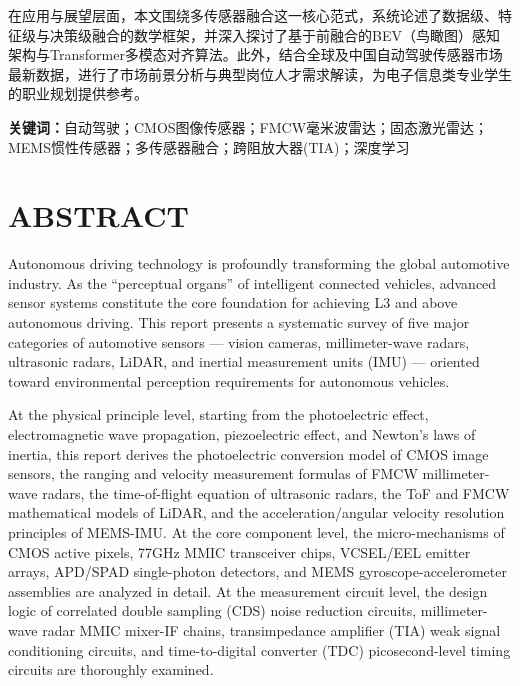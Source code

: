 \documentclass[12pt,a4paper,openany,UTF8]{ctexbook}
\begin{document}
在应用与展望层面，本文围绕多传感器融合这一核心范式，系统论述了数据级、特征级与决策级融合的数学框架，并深入探讨了基于前融合的BEV（鸟瞰图）感知架构与Transformer多模态对齐算法。此外，结合全球及中国自动驾驶传感器市场最新数据，进行了市场前景分析与典型岗位人才需求解读，为电子信息类专业学生的职业规划提供参考。

\vspace{1em}
\noindent\textbf{关键词：}自动驾驶；CMOS图像传感器；FMCW毫米波雷达；固态激光雷达；MEMS惯性传感器；多传感器融合；跨阻放大器(TIA)；深度学习

\clearpage

\chapter*{\bfseries ABSTRACT}

Autonomous driving technology is profoundly transforming the global automotive industry. As the ``perceptual organs'' of intelligent connected vehicles, advanced sensor systems constitute the core foundation for achieving L3 and above autonomous driving. This report presents a systematic survey of five major categories of automotive sensors — vision cameras, millimeter-wave radars, ultrasonic radars, LiDAR, and inertial measurement units (IMU) — oriented toward environmental perception requirements for autonomous vehicles.

At the physical principle level, starting from the photoelectric effect, electromagnetic wave propagation, piezoelectric effect, and Newton's laws of inertia, this report derives the photoelectric conversion model of CMOS image sensors, the ranging and velocity measurement formulas of FMCW millimeter-wave radars, the time-of-flight equation of ultrasonic radars, the ToF and FMCW mathematical models of LiDAR, and the acceleration/angular velocity resolution principles of MEMS-IMU. At the core component level, the micro-mechanisms of CMOS active pixels, 77GHz MMIC transceiver chips, VCSEL/EEL emitter arrays, APD/SPAD single-photon detectors, and MEMS gyroscope-accelerometer assemblies are analyzed in detail. At the measurement circuit level, the design logic of correlated double sampling (CDS) noise reduction circuits, millimeter-wave radar MMIC mixer-IF chains, transimpedance amplifier (TIA) weak signal conditioning circuits, and time-to-digital converter (TDC) picosecond-level timing circuits are thoroughly examined.
\end{document}
